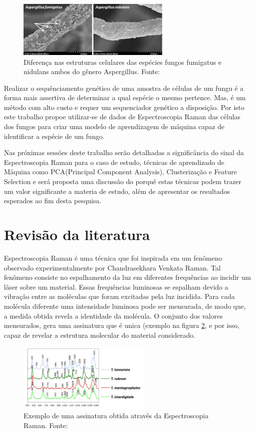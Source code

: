 \documentclass[conference,peerreview]{IEEEtran}
\begin{document}
\begin{figure}[ht]
\centering
\includegraphics[width=7.5cm]{fungus_dif}
\caption{Diferença nas estruturas celulares das espécies fungos fumigatus e nidulans ambos do gênero Aspergillus. Fonte: \cite{Lee2015}}
\label{fg_exemp1}
\end{figure}

Realizar o sequênciamento genético de uma amostra de células de um fungu é a forma mais assertiva de determinar a qual espécie o mesmo pertence. Mas, é um método com alto custo e requer um sequenciador genético a disposição. Por isto este trabalho propoe utilizar-se de dados de Espectroscopia Raman das células dos fungos para criar uma modelo de aprendizagem de máquina capaz de identificar a espécie de um fungo.

Nas próximas sessões deste trabalho serão detalhadas a significância do sinal da Espectroscopia Raman para o caso de estudo, técnicas de aprendizado de Máquina como PCA(Principal Component Analysis), Clusterização e Feature Selection e será proposta uma discussão do porquê estas técnicas podem trazer um valor significante a materia de estudo, além de apresentar os resultados esperados ao fim desta pesquisa.

\section{Revisão da literatura}

Espectroscopia Raman é uma técnica que foi inspirada em um fenômeno observado experimentalmente por Chandrasekhara Venkata Raman. Tal fenômeno consiste no espalhamento da luz em diferentes frequências ao incidir um lâser sobre um material. Essas frequências luminosas se espalham devido a vibração entre as moléculas que foram excitadas pela luz incidida. Para cada molécula diferente uma intensidade luminosa pode ser mensurada, de modo que, a medida obtida revela a identidade da molécula. O conjunto dos valores mensurados, gera uma assinatura que é unica (exemplo na figura \ref{fg_exemp2}, e por isso, capaz de revelar a estrutura molecular do material considerado.

\begin{figure}[ht]
\centering
\includegraphics[width=6.5cm]{assinatura_raman_exemplo}
\caption{Exemplo de uma assinatura obtida atravês da Espectroscopia Raman. Fonte: \cite{Butler2016}}
\label{fg_exemp2}
\end{figure}
\end{document}
